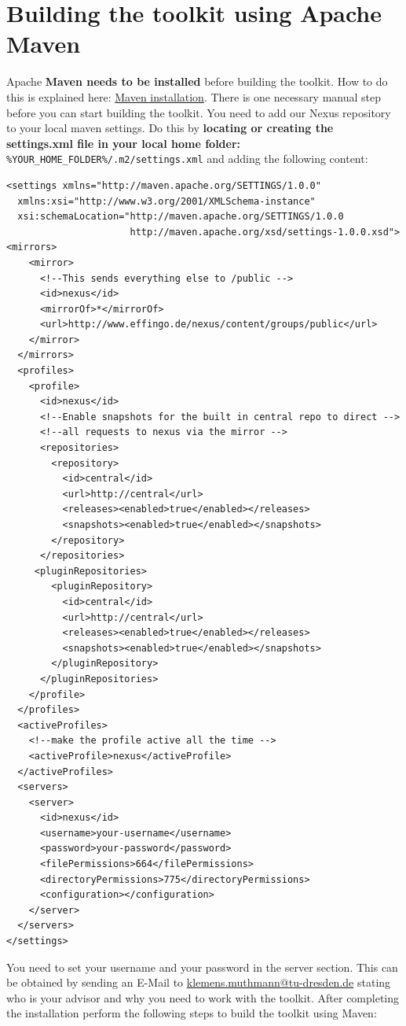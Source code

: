 \documentclass[a4paper,twoside]{book}      %
\begin{document}
\section{Building the toolkit using Apache Maven}
\label{sec:buildingthetoolkitusingapachemaven}
Apache \textbf{Maven needs to be installed} before building the toolkit. How to do this is explained here: \href{http://maven.apache.org/download.html#Installation}{Maven installation}. There is one necessary manual step before you can start building the toolkit. You need to add our Nexus repository to your local maven settings. Do this by \textbf{locating or creating the settings.xml file in your local home folder:} \texttt{\%YOUR\_HOME\_FOLDER\%/.m2/settings.xml} and adding the following content:
\begin{verbatim}
<settings xmlns="http://maven.apache.org/SETTINGS/1.0.0"
  xmlns:xsi="http://www.w3.org/2001/XMLSchema-instance"
  xsi:schemaLocation="http://maven.apache.org/SETTINGS/1.0.0
                      http://maven.apache.org/xsd/settings-1.0.0.xsd">
<mirrors>
    <mirror>
      <!--This sends everything else to /public -->
      <id>nexus</id>
      <mirrorOf>*</mirrorOf>
      <url>http://www.effingo.de/nexus/content/groups/public</url>
    </mirror>
  </mirrors>
  <profiles>
    <profile>
      <id>nexus</id>
      <!--Enable snapshots for the built in central repo to direct -->
      <!--all requests to nexus via the mirror -->
      <repositories>
        <repository>
          <id>central</id>
          <url>http://central</url>
          <releases><enabled>true</enabled></releases>
          <snapshots><enabled>true</enabled></snapshots>
        </repository>
      </repositories>
     <pluginRepositories>
        <pluginRepository>
          <id>central</id>
          <url>http://central</url>
          <releases><enabled>true</enabled></releases>
          <snapshots><enabled>true</enabled></snapshots>
        </pluginRepository>
      </pluginRepositories>
    </profile>
  </profiles>
  <activeProfiles>
    <!--make the profile active all the time -->
    <activeProfile>nexus</activeProfile>
  </activeProfiles>
  <servers>
    <server>
      <id>nexus</id>
      <username>your-username</username>
      <password>your-password</password>
      <filePermissions>664</filePermissions>
      <directoryPermissions>775</directoryPermissions>
      <configuration></configuration>
    </server>
  </servers>
</settings>
\end{verbatim}
You need to set your username and your password in the server section. This can be obtained by sending an E-Mail to \href{mailto:klemens.muthmann@tu-dresden.de}{klemens.muthmann@tu-dresden.de} stating who is your advisor and why you need to work with the toolkit. After completing the installation perform the following steps to build the toolkit using Maven:
\end{document}
